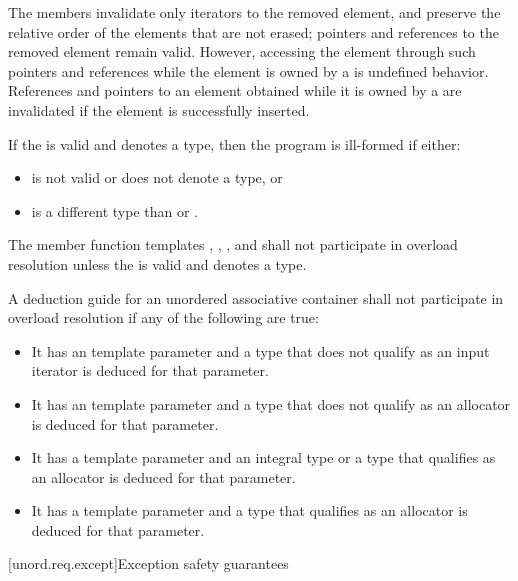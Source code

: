 \pnum
The  members invalidate only iterators to the removed element,
and preserve the relative order of the elements that are not erased; pointers
and references to the removed element remain valid. However, accessing the
element through such pointers and references while the element is owned by a
 is undefined behavior. References and pointers to an element
obtained while it is owned by a  are invalidated if the
element is successfully inserted.

\pnum
If the  
is valid and denotes a type,
then the program is ill-formed if either:
\begin{itemize}
\item
   
  is not valid or does not denote a type, or
\item
   is a different type than  or
  .
\end{itemize}
The member function templates
, , , and 
shall not participate in overload resolution unless
the  
is valid and denotes a type.

\pnum
A deduction guide for an unordered associative container shall not participate in overload resolution
if any of the following are true:
\begin{itemize}
\item It has an  template parameter
and a type that does not qualify as an input iterator is deduced for that parameter.

\item It has an  template parameter
and a type that does not qualify as an allocator is deduced for that parameter.

\item It has a  template parameter
and an integral type or a type that qualifies as an allocator is deduced for that parameter.

\item It has a  template parameter
and a type that qualifies as an allocator is deduced for that parameter.
\end{itemize}

[unord.req.except]{Exception safety guarantees}

